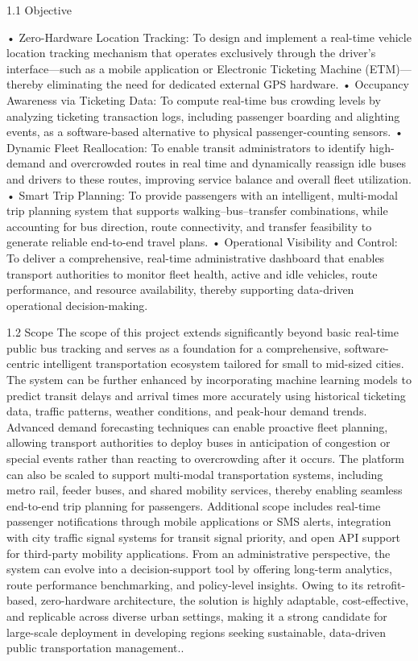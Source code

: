 1.1	 Objective

•	Zero-Hardware Location Tracking: To design and implement a real-time vehicle location tracking mechanism that operates exclusively through the driver’s interface—such as a mobile application or Electronic Ticketing Machine (ETM)—thereby eliminating the need for dedicated external GPS hardware. 
•	Occupancy Awareness via Ticketing Data: To compute real-time bus crowding levels by analyzing ticketing transaction logs, including passenger boarding and alighting events, as a software-based alternative to physical passenger-counting sensors. 
•	Dynamic Fleet Reallocation: To enable transit administrators to identify high-demand and overcrowded routes in real time and dynamically reassign idle buses and drivers to these routes, improving service balance and overall fleet utilization. 
•	Smart Trip Planning: To provide passengers with an intelligent, multi-modal trip planning system that supports walking–bus–transfer combinations, while accounting for bus direction, route connectivity, and transfer feasibility to generate reliable end-to-end travel plans. 
•	Operational Visibility and Control: To deliver a comprehensive, real-time administrative dashboard that enables transport authorities to monitor fleet health, active and idle vehicles, route performance, and resource availability, thereby supporting data-driven operational decision-making. 

1.2	 Scope
The scope of this project extends significantly beyond basic real-time public bus tracking and serves as a foundation for a comprehensive, software-centric intelligent transportation ecosystem tailored for small to mid-sized cities. The system can be further enhanced by incorporating machine learning models to predict transit delays and arrival times more accurately using historical ticketing data, traffic patterns, weather conditions, and peak-hour demand trends. Advanced demand forecasting techniques can enable proactive fleet planning, allowing transport authorities to deploy buses in anticipation of congestion or special events rather than reacting to overcrowding after it occurs. The platform can also be scaled to support multi-modal transportation systems, including metro rail, feeder buses, and shared mobility services, thereby enabling seamless end-to-end trip planning for passengers. Additional scope includes real-time passenger notifications through mobile applications or SMS alerts, integration with city traffic signal systems for transit signal priority, and open API support for third-party mobility applications. From an administrative perspective, the system can evolve into a decision-support tool by offering long-term analytics, route performance benchmarking, and policy-level insights. Owing to its retrofit-based, zero-hardware architecture, the solution is highly adaptable, cost-effective, and replicable across diverse urban settings, making it a strong candidate for large-scale deployment in developing regions seeking sustainable, data-driven public transportation management..





